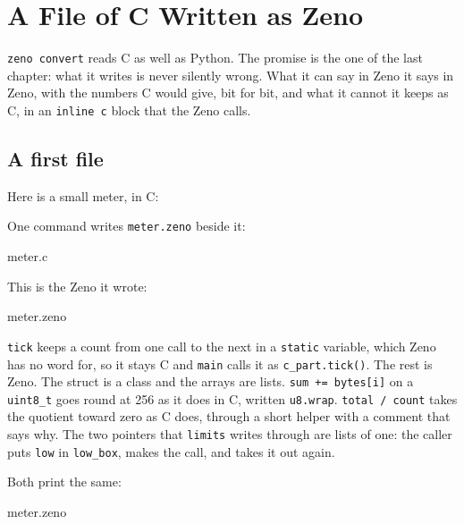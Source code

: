 \chapter{A File of C Written as Zeno}\label{ch-convert-c}

\verb|zeno convert| reads C as well as Python. The promise is the one
of the last chapter: what it writes is never silently wrong. What it
can say in Zeno it says in Zeno, with the numbers C would give, bit
for bit, and what it cannot it keeps as C, in an \verb|inline c| block
that the Zeno calls.

\section{A first file}

Here is a small meter, in C:

\begin{zeno}[file=meter.c, dir=convertc, src=tools/convert/meter.c, lines=2-59, run=no]
\end{zeno}

One command writes \verb|meter.zeno| beside it:

\begin{zeno}[file=read.txt, dir=convertc, show=no, cmd=zeno convert meter.c]
meter.c
\end{zeno}

This is the Zeno it wrote:

\begin{zeno}[file=read.txt, dir=convertc, show=no, cmd=cat meter.zeno]
meter.zeno
\end{zeno}

\verb|tick| keeps a count from one call to the next in a
\verb|static| variable, which Zeno has no word for, so it stays C and
\verb|main| calls it as \verb|c_part.tick()|. The rest is Zeno. The
struct is a class and the arrays are lists. \verb|sum += bytes[i]| on
a \verb|uint8_t| goes round at 256 as it does in C, written
\verb|u8.wrap|. \verb|total / count| takes the quotient toward zero as
C does, through a short helper with a comment that says why. The two
pointers that \verb|limits| writes through are lists of one: the
caller puts \verb|low| in \verb|low_box|, makes the call, and takes it
out again.

Both print the same:

\begin{zeno}[file=read.txt, dir=convertc, show=no, cmd=zeno run meter.zeno ;; cc -o meter meter.c ;; ./meter]
meter.zeno
\end{zeno}

